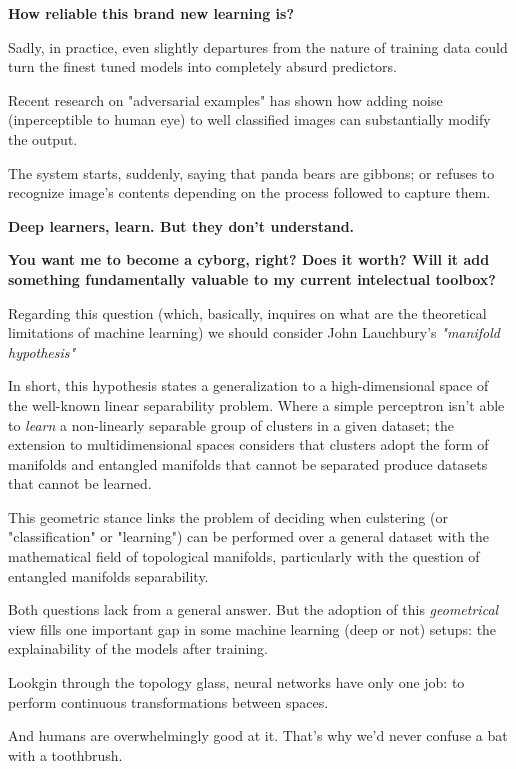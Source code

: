 \textbf{How reliable this brand new learning is?}

Sadly, in practice, even slightly departures from the nature of training data could
turn the finest tuned models into completely absurd predictors.

Recent research on "adversarial examples"\cite{adversarial} has shown how adding 
noise (inperceptible to human eye) to well classified images can substantially modify 
the output.

The system starts, suddenly, saying that panda bears are gibbons; \cite{panda} or refuses to 
recognize image's contents depending on the process followed to capture them.

\textbf{Deep learners, learn. But they don't understand.}

\textbf{You want me to become a cyborg, right? Does it worth? Will it add 
something fundamentally valuable to my current intelectual toolbox?}

Regarding this question (which, basically, inquires on what are the theoretical 
limitations of machine learning) we should consider John Lauchbury's \textit{
"manifold hypothesis"} \cite{darpa} 

In short, this hypothesis states a generalization to a high-dimensional space 
of the well-known linear separability problem. Where a simple perceptron isn't 
able to \textit{learn} a non-linearly separable group of clusters in a given 
dataset; the extension to multidimensional spaces considers that clusters adopt 
the form of manifolds and entangled manifolds that cannot be separated produce 
datasets that cannot be learned.

This geometric stance links the problem of deciding when culstering (or 
"classification" or "learning") can be performed over a general dataset with 
the mathematical field of topological manifolds, particularly with the question 
of entangled manifolds separability.\cite{topology}

Both questions lack from a general answer. But the adoption of this \textit{
geometrical} view fills one important gap in some machine learning (deep or not) 
setups: the explainability of the models after training.

Lookgin through the topology glass, neural networks have only one job: to perform 
continuous transformations between spaces. 

And humans are overwhelmingly good at it. That's why we'd never confuse a bat 
with a toothbrush.  
